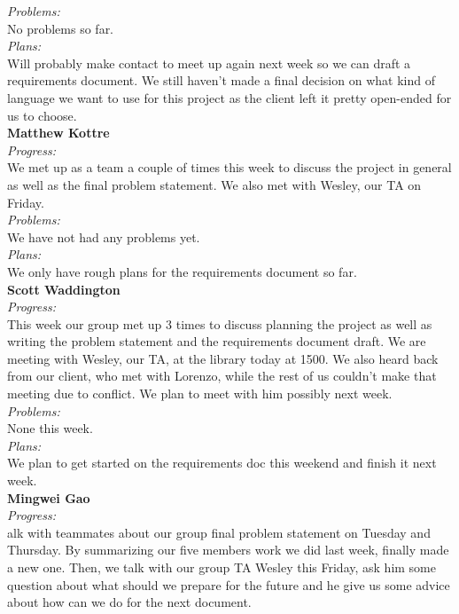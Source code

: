 \noindent\textit{Problems:}\\
\noindent No problems so far.\\

\noindent\textit{Plans:}\\
\noindent Will probably make contact to meet up again next week so we can draft a requirements document. We still haven’t made a final decision on what kind of language we want to use for this project as the client left it pretty open-ended for us to choose.\\

\noindent\textbf{Matthew Kottre}\\
\noindent\textit{Progress:}\\
We met up as a team a couple of times this week to discuss the project in general as well as the final problem statement. We also met with Wesley, our TA on Friday.\\

\noindent\textit{Problems:}\\
\noindent We have not had any problems yet.\\

\noindent\textit{Plans:}\\
\noindent We only have rough plans for the requirements document so far.\\

\noindent\textbf{Scott Waddington}\\
\noindent\textit{Progress:}\\
This week our group met up 3 times to discuss planning the project as well as writing the problem statement and the requirements document draft. We are meeting with Wesley, our TA, at the library today at 1500. We also heard back from our client, who met with Lorenzo, while the rest of us couldn't make that meeting due to conflict. We plan to meet with him possibly next week.\\

\noindent\textit{Problems:}\\
\noindent None this week.\\

\noindent\textit{Plans:}\\
\noindent We plan to get started on the requirements doc this weekend and finish it next week.\\

\noindent\textbf{Mingwei Gao}\\
\noindent\textit{Progress:}\\
alk with teammates about our group final problem statement on Tuesday and Thursday. By summarizing our five members work we did last week, finally made a new one. Then, we talk with our group TA Wesley this Friday, ask him some question about what should we prepare for the future and he give us some advice about how can we do for the next document.\\

